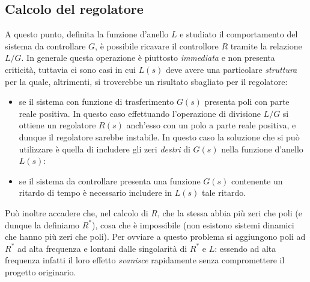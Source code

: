 	\subsection{Calcolo del regolatore}
		A questo punto, definita la funzione d'anello $L$ e studiato il comportamento del sistema da controllare $G$, è possibile ricavare il controllore $R$ tramite la relazione $L/G$. In generale questa operazione è piuttosto \textit{immediata} e non presenta criticità, tuttavia ci sono casi in cui $L(s)$ deve avere una particolare \textit{struttura} per la quale, altrimenti, si troverebbe un risultato sbagliato per il regolatore:
		\begin{itemize}
			\item se il sistema con funzione di trasferimento $G(s)$ presenta poli con parte reale positiva. In questo caso effettuando l'operazione di divisione $L/G$ si ottiene un regolatore $R(s)$ anch'esso con un polo a parte reale positiva, e dunque il regolatore sarebbe instabile. In questo caso la soluzione che si può utilizzare è quella di includere gli zeri \textit{destri } di $G(s)$ nella funzione d'anello $L(s)$:
			
			\item se il sistema da controllare presenta una funzione $G(s)$ contenente un ritardo di tempo è necessario includere in $L(s)$ tale ritardo.
			
		\end{itemize}	

		Può inoltre accadere che, nel calcolo di $R$, che la stessa abbia più zeri che poli (e dunque la definiamo $R^*$), cosa che è impossibile (non esistono sistemi dinamici che hanno più zeri che poli). Per ovviare a questo problema si aggiungono poli ad $R^*$ ad alta frequenza e lontani dalle singolarità di $R^*$ e $L$: essendo ad alta frequenza infatti il loro effetto \textit{svanisce} rapidamente senza compromettere il progetto originario.



























